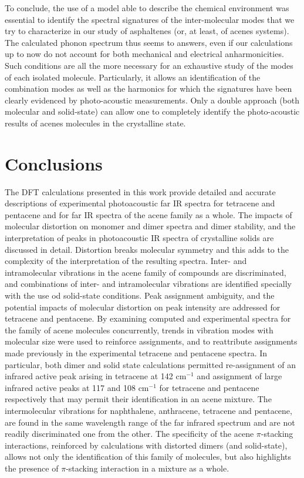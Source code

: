  To conclude, the use of a model able to describe the chemical environment was essential to identify the spectral signatures of the inter-molecular modes that we try to characterize in our study of asphaltenes (or, at least, of acenes systems). The calculated phonon spectrum thus seems to answers, even if our calculations up to now do not account for both mechanical and electrical anharmonicities. Such conditions are all the more necessary for an exhaustive study of the modes of each isolated molecule. Particularly, it allows an identification of the combination modes as well as the harmonics for which the signatures have been clearly evidenced by photo-acoustic measurements. Only a double approach (both molecular and solid-state) can allow one to completely identify the photo-acoustic results of acenes molecules in the crystalline state.
 
 \section*{Conclusions}
 
 The DFT calculations presented in this work provide detailed and accurate descriptions of experimental photoacoustic far IR spectra for tetracene and pentacene and for far IR spectra of the acene family as a whole.  The impacts of molecular distortion on monomer and dimer spectra and dimer stability, and the interpretation of peaks in photoacoustic IR spectra of crystalline solids are discussed in detail. Distortion breaks molecular symmetry and this adds to the complexity of the interpretation of the resulting spectra. Inter- and intramolecular vibrations in the acene family of compounds are discriminated, and combinations of inter- and intramolecular vibrations are identified specially with the use od solid-state conditions. Peak assignment ambiguity, and the potential impacts of molecular distortion on peak intensity are addressed for tetracene and pentacene. By examining computed and experimental spectra for the family of acene molecules concurrently, trends in vibration modes with molecular size were used to reinforce assignments, and to reattribute assignments made previously in the experimental tetracene and pentacene spectra. In particular, both dimer and solid state calculations permitted re-assignment of an infrared active peak arising in tetracene at 142 cm$^{-1}$ and assignment of large infrared active peaks at 117 and 108 cm$^{-1}$ for tetracene and pentacene respectively that may permit their identification in an acene mixture. The intermolecular vibrations for naphthalene, anthracene, tetracene and pentacene, are found in the same wavelength range of the far infrared spectrum and are not readily discriminated one from the other. The specificity of the acene $\pi$-stacking interactions, reinforced by calculations with distorted dimers (and solid-state), allows not only the identification of this family of molecules, but also highlights the presence of $\pi$-stacking interaction in a mixture as a whole.
 
